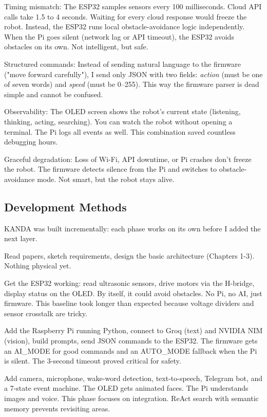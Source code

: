 Timing mismatch: The ESP32 samples sensors every 100 milliseconds. Cloud API calls take 1.5 to 4 seconds. Waiting for every cloud response would freeze the robot. Instead, the ESP32 runs local obstacle-avoidance logic independently. When the Pi goes silent (network lag or API timeout), the ESP32 avoids obstacles on its own. Not intelligent, but safe.

Structured commands: Instead of sending natural language to the firmware ("move forward carefully"), I send only JSON with two fields: \textit{action} (must be one of seven words) and \textit{speed} (must be 0--255). This way the firmware parser is dead simple and cannot be confused.


Observability: The OLED screen shows the robot's current state (listening, thinking, acting, searching). You can watch the robot without opening a terminal. The Pi logs all events as well. This combination saved countless debugging hours.

Graceful degradation: Loss of Wi-Fi, API downtime, or Pi crashes don't freeze the robot. The firmware detects silence from the Pi and switches to obstacle-avoidance mode. Not smart, but the robot stays alive.

\subsection{Development Methods}
\label{subsec:dev_methods}

KANDA was built incrementally: each phase works on its own before I added the next layer.


\begin{description}[nosep]
  \item[Foundations:] Read papers, sketch requirements, design the basic architecture (Chapters 1-3). Nothing physical yet.
  
  \item[Embodiment layer:] Get the ESP32 working: read ultrasonic sensors, drive motors via the H-bridge, display status on the OLED. By itself, it could avoid obstacles. No Pi, no AI, just firmware. This baseline took longer than expected because voltage dividers and sensor crosstalk are tricky.
  
  \item[Intelligence layer:] Add the Raspberry Pi running Python, connect to Groq (text) and NVIDIA NIM (vision), build prompts, send JSON commands to the ESP32. The firmware gets an AI\_MODE for good commands and an AUTO\_MODE fallback when the Pi is silent. The 3-second timeout proved critical for safety.
  
  \item[Multimodal agent:] Add camera, microphone, wake-word detection, text-to-speech, Telegram bot, and a 7-state event machine. The OLED gets animated faces. The Pi understands images and voice. This phase focuses on integration. ReAct search with semantic memory prevents revisiting areas.
\end{description}

